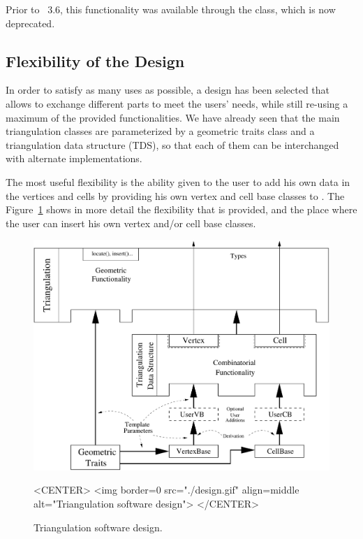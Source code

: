 Prior to \cgal\ 3.6, this functionality was available through the
 class, which is now deprecated.

\subsection{Flexibility of the Design}

In order to satisfy as many uses as possible, a design has been selected that
allows to exchange different parts to meet the users' needs, while still
re-using a maximum of the provided functionalities.  We have already seen that
the main triangulation classes are parameterized by a geometric traits class
and a triangulation data structure (TDS), so that each of them can be
interchanged with alternate implementations.

The most useful flexibility is the ability given to the user to add his own
data in the vertices and cells by providing his own vertex and cell base
classes to .  The
Figure~\ref{T3-fig-layers} shows in more detail the flexibility that is
provided, and the place where the user can insert his own vertex and/or cell
base classes.

\begin{figure}[htbp]
\begin{ccTexOnly}
\begin{center}
\includegraphics[width=13cm]{Triangulation_3/design}
\end{center}
\end{ccTexOnly}
\begin{ccHtmlOnly}
<CENTER>
<img border=0 src="./design.gif" align=middle alt="Triangulation software design">
</CENTER>
\end{ccHtmlOnly}
\caption{Triangulation software design.
\label{T3-fig-layers}}
\end{figure}


